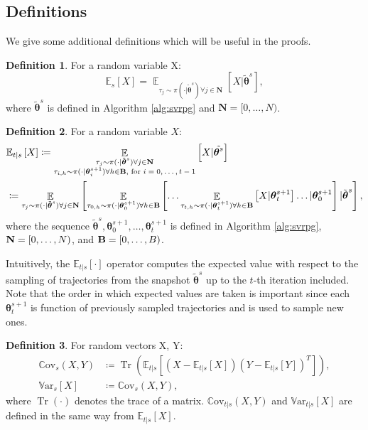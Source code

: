 \documentclass{article}
\theoremstyle{remark}
\theoremstyle{definition}
\newtheorem{definition}{Definition}[section]
\DeclareMathOperator*{\EV}{\mathbb{E}}
\DeclareMathOperator{\Tr}{Tr}
\newcommand{\EVV}[2][\ppvect \in \ppspace]{\EV_{#1}\left[{#2}\right]}
\newcommand{\vtheta}{\boldsymbol{\theta}}
\newcommand{\Ets}[2][t]{\mathbb{E}_{#1\vert s}\left[#2\right]}
\newcommand{\Es}[1]{\mathbb{E}_{s}\left[#1\right]}
\newcommand{\Covts}[3][t]{{\mathbb{C}\text{ov}}_{#1\vert s}\left(#2,#3\right)}
\newcommand{\Covs}[2]{{\mathbb{C}\text{ov}}_{s}\left(#1,#2\right)}
\newcommand{\Varts}[2][t]{{\mathbb{V}\text{ar}}_{#1\vert s}\left[#2\right]}
\newcommand{\Vars}[1]{{\mathbb{V}\text{ar}}_{s}\left[#1\right]}
\begin{document}
\subsection*{Definitions}
We give some additional definitions which will be useful in the proofs.

\begin{definition}
For a random variable X:
\[
	\Es{X} = \EVV[\tau_j\sim\pi(\cdot\vert\tilde{\vtheta}^s)
		\forall j\in\mathbf{N}]{X\vert\tilde{\vtheta}^s},
\]
where $\tilde{\vtheta}^s$ is defined in Algorithm \ref{alg:svrpg} and $\mathbf{N} = [0,\dots,N)$.
\end{definition}

\begin{definition}
For a random variable $X$:
\begin{align*}
	&\mathbb{E}_{t\vert s}\left[X\right] \coloneqq 
		\mathop{\mathbb{E}}_{\substack{\tau_j\sim\pi(\cdot\vert\tilde{\vtheta}^s)\forall j \in {\it {\bf N}} \\ \tau_{i,h}\sim\pi(\cdot\vert\vtheta^{s+1}_i) \forall h \in {\it {\bf B}}, \text{ for $i=0,\dots,t-1$}}}{\left[X \vert \tilde{\vtheta^s}\right]} \\
	&\coloneqq \EVV[\tau_j\sim\pi(\cdot\vert\tilde{\vtheta}^s)\forall j \in {\it {\bf N}}]{
			\EVV[\tau_{0,h}\sim\pi(\cdot\vert\vtheta_0^{s+1}) \forall h \in {\it {\bf B}}]
				{\dots
					\EVV[\tau_{t,h}\sim\pi(\cdot\vert\vtheta_t^{s+1})\forall h \in {\it {\bf B}}]
						{X\vert\vtheta_t^{s+1}}
				 \dots
			\vert\vtheta_0^{s+1}}
		\vert\tilde{\vtheta}^s},
\end{align*}
where the sequence $\tilde{\vtheta}^s,\vtheta_0^{s+1},\dots,\vtheta_t^{s+1}$ is defined in Algorithm \ref{alg:svrpg}, ${\it {\bf N}} = [0,\dots,N)$, and ${\it {\bf B}} = [0,\dots,B)$. 
\end{definition}
Intuitively, the $\Ets{\cdot}$ operator computes the expected value with respect to the sampling of trajectories from the snapshot $\tilde{\vtheta}^s$ up to the $t$-th iteration included. Note that the order in which expected values are taken is important since each $\vtheta_{t}^{s+1}$ is function of previously sampled trajectories and is used to sample new ones.

\begin{definition}
For random vectors X, Y:
\begin{align*}
	\Covs{X}{Y} &\coloneqq \Tr\left(\Ets{(X-\Ets{X})(Y-\Ets{Y})^T}\right), \\
	\Vars{X} &\coloneqq \Covs{X}{Y},
\end{align*}
where $\Tr(\cdot)$ denotes the trace of a matrix. $\Covts[t]{X}{Y}$ and $\Varts[t]{X}$ are defined in the same way from $\Ets[t]{X}$.
\end{definition}
\end{document}
